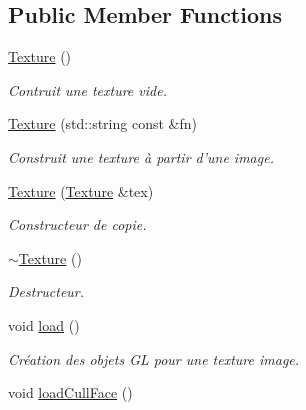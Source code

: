 \subsection*{Public Member Functions}
\begin{DoxyCompactItemize}
\item 
\hypertarget{classTexture_a6c275e3f186675ff6ed73ccf970e552f}{\hyperlink{classTexture_a6c275e3f186675ff6ed73ccf970e552f}{Texture} ()}\label{classTexture_a6c275e3f186675ff6ed73ccf970e552f}

\begin{DoxyCompactList}\small\item\em Contruit une texture vide. \end{DoxyCompactList}\item 
\hypertarget{classTexture_a20743f514b11d6de3ee3a2517fc36c1f}{\hyperlink{classTexture_a20743f514b11d6de3ee3a2517fc36c1f}{Texture} (std\+::string const \&fn)}\label{classTexture_a20743f514b11d6de3ee3a2517fc36c1f}

\begin{DoxyCompactList}\small\item\em Construit une texture à partir d'une image. \end{DoxyCompactList}\item 
\hypertarget{classTexture_abc7ef59dd742a585d2bd1a0c13a7b64f}{\hyperlink{classTexture_abc7ef59dd742a585d2bd1a0c13a7b64f}{Texture} (\hyperlink{classTexture}{Texture} \&tex)}\label{classTexture_abc7ef59dd742a585d2bd1a0c13a7b64f}

\begin{DoxyCompactList}\small\item\em Constructeur de copie. \end{DoxyCompactList}\item 
\hypertarget{classTexture_a09c4bcb7462f64c1d20fa69dba3cee8a}{\hyperlink{classTexture_a09c4bcb7462f64c1d20fa69dba3cee8a}{$\sim$\+Texture} ()}\label{classTexture_a09c4bcb7462f64c1d20fa69dba3cee8a}

\begin{DoxyCompactList}\small\item\em Destructeur. \end{DoxyCompactList}\item 
\hypertarget{classTexture_ad3a36458f5ccd281b964ad1b2b4f92db}{void \hyperlink{classTexture_ad3a36458f5ccd281b964ad1b2b4f92db}{load} ()}\label{classTexture_ad3a36458f5ccd281b964ad1b2b4f92db}

\begin{DoxyCompactList}\small\item\em Création des objets G\+L pour une texture image. \end{DoxyCompactList}\item 
\hypertarget{classTexture_a460d3f86d1add69bd0c81623865b990a}{void \hyperlink{classTexture_a460d3f86d1add69bd0c81623865b990a}{load\+Cull\+Face} ()}\label{classTexture_a460d3f86d1add69bd0c81623865b990a}


\end{DoxyCompactItemize}
